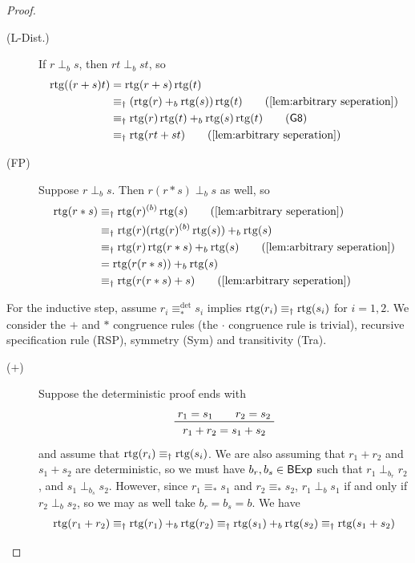 \documentclass[orivec,envcountsect,envcountsame]{llncs}
\begin{document}
\begin{proof}
\begin{description}
		\item[(L-Dist.)] If \(r \perp_b s\), then \(rt\perp_b st\), so
		\begin{align*}
			\rtg((r + s)t)
			&= \rtg(r + s)\rtg(t)  \\
			&\equiv_\dagger (\rtg(r) +_b \rtg(s))\rtg(t) \tag{\cref{lem:arbitrary seperation}}\\
			&\equiv_\dagger \rtg(r)\rtg(t) +_b \rtg(s)\rtg(t) \tag{\textsf{G8}} \\
			&\equiv_\dagger \rtg(rt + st) \tag{\cref{lem:arbitrary seperation}}
		\end{align*}

		\item[(\textsf{FP})] Suppose \(r \perp_b s\).
		Then \(r(r * s) \perp_b s\) as well, so
		\begin{align*}
			\rtg(r * s)
			&\equiv_\dagger \rtg(r) \while{b} \rtg(s) \tag{\cref{lem:arbitrary seperation}}\\
			&\equiv_\dagger \rtg(r) (\rtg(r) \while{b} \rtg(s)) +_b \rtg(s) \\
			&\equiv_\dagger \rtg(r) \rtg(r*s) +_b \rtg(s) \tag{\cref{lem:arbitrary seperation}}\\
			&= \rtg(r(r*s)) +_b \rtg(s) \\
			&\equiv_\dagger \rtg(r(r*s) + s) \tag{\cref{lem:arbitrary seperation}}
		\end{align*}
	\end{description}
	For the inductive step, assume \(r_i \equiv_*^{\det} s_i\) implies \(\operatorname{rtg}(r_i) \equiv_\dagger \operatorname{rtg}(s_i)\) for \(i = 1,2\).
	We consider the \(+\) and \(*\) congruence rules (the \(\cdot\) congruence rule is trivial), recursive specification rule (\textsf{RSP}), symmetry (Sym) and transitivity (Tra).
	\begin{description}
		\item[(\(+\))] Suppose the deterministic proof ends with
		\[
		\prftree{r_1 = s_1 \qquad r_2 = s_2}{r_1 + r_2 = s_1 + s_2}
		\]
		and assume that \(\operatorname{rtg}(r_i) \equiv_\dagger \operatorname{rtg}(s_i)\).
		We are also assuming that \(r_1 + r_2\) and \(s_1 + s_2\) are deterministic, so we must have \(b_r,b_s \in \mathsf{BExp}\) such that \(r_1 \perp_{b_r} r_2\), and \(s_1 \perp_{b_s} s_2\).
		However, since \(r_1 \equiv_* s_1\) and \(r_2 \equiv_* s_2\), \(r_1 \perp_b s_1\) if and only if \(r_2 \perp_b s_2\), so we may as well take \(b_r = b_s = b\).
		We have
		\begin{align*}
			\operatorname{rtg}(r_1 + r_2)
			\equiv_\dagger \operatorname{rtg}(r_1) +_b \operatorname{rtg}(r_2)
			\equiv_\dagger \operatorname{rtg}(s_1) +_b \operatorname{rtg}(s_2)
			\equiv_\dagger \operatorname{rtg}(s_1 + s_2)
		\end{align*}


\end{description}
\end{proof}
\end{document}
